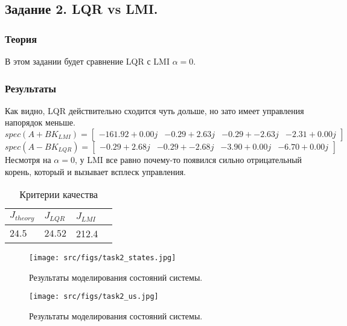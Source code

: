 \subsection{Задание 2. LQR vs LMI.}
\subsubsection{Теория}
В этом задании будет сравнение LQR с LMI \(\alpha = 0\).

\subsubsection{Результаты}
Как видно, LQR действительно сходится чуть дольше, но зато имеет управления напорядок меньше.
\[spec(A+BK_{LMI}) = \begin{bmatrix}
    -161.92 + 0.00j & -0.29 + 2.63j & -0.29 + -2.63j & -2.31 + 0.00j
   \end{bmatrix}
\]
\[spec(A-BK_{LQR}) = 
\begin{bmatrix}
    -0.29 + 2.68j & -0.29 + -2.68j & -3.90 + 0.00j & -6.70 + 0.00j
   \end{bmatrix}
\]
Несмотря на \(\alpha = 0\), у LMI все равно почему-то появился сильно отрицательный корень, который и вызывает всплеск управления.
\begin{table}[h!]
    \centering
    \begin{tabular}{| l | l | l | l |} 
        \hline
        $J_{theory}$ & $J_{LQR}$ & $J_{LMI}$ \\  
        \hline
        $24.5$ & $24.52$ & 212.4  \\   
        \hline
    \end{tabular}
    \caption{Критерии качества}
    \label{table:task2}
\end{table}



\begin{figure}[ht!]
    \centering
    \texttt{[image: src/figs/task2\_states.jpg]}
    \caption{Результаты моделирования состояний системы.}
    \label{fig:task2_states}
\end{figure}
\begin{figure}[ht!]
    \centering
    \texttt{[image: src/figs/task2\_us.jpg]}
    \caption{Результаты моделирования состояний системы.}
    \label{fig:task2_us}
\end{figure}

\FloatBarrier